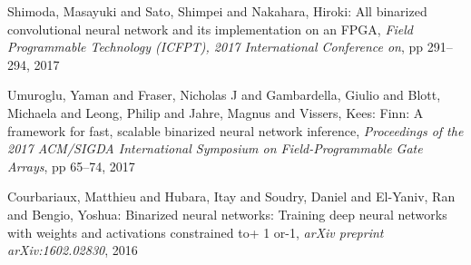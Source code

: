 \documentclass[techrep,english]{ipsj} %
\begin{document}
\begin{thebibliography}{99}
  Shimoda, Masayuki and Sato, Shimpei and Nakahara, Hiroki:
  All binarized convolutional neural network and its implementation on an FPGA,
  {\it  Field Programmable Technology (ICFPT), 2017 International Conference on},
  pp 291–294, 2017

  Umuroglu, Yaman and Fraser, Nicholas J and Gambardella, Giulio and Blott, Michaela and Leong, Philip and Jahre, Magnus and Vissers, Kees:
  Finn: A framework for fast, scalable binarized neural network inference,
  {\it  Proceedings of the 2017 ACM/SIGDA International Symposium on Field-Programmable Gate Arrays},
  pp 65–74, 2017


  Courbariaux, Matthieu and Hubara, Itay and Soudry, Daniel and El-Yaniv, Ran and Bengio, Yoshua:
  Binarized neural networks: Training deep neural networks with weights and activations constrained to+ 1 or-1,
  {\it arXiv preprint arXiv:1602.02830},
  2016
  
\end{thebibliography}  
\end{document}
